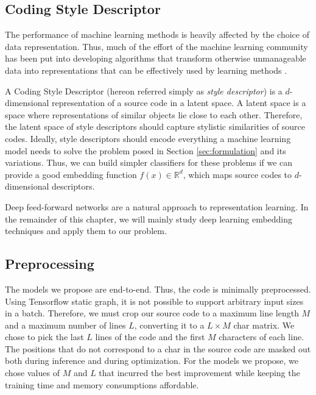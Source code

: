 \subsection{Coding Style Descriptor}\label{sec:descriptor}

The performance of machine learning methods is heavily affected by the choice of data representation. Thus, much of the effort of the machine learning community has been put into developing algorithms that transform otherwise unmanageable data into representations that can be effectively used by learning methods \cite{representation_learning}.

A Coding Style Descriptor (hereon referred simply as \textit{style descriptor}) is a $d$-dimensional representation of a source code in a latent space. A latent space is a space where representations of similar objects lie close to each other. Therefore, the latent space of style descriptors should capture stylistic similarities of source codes. Ideally, style descriptors should encode everything a machine learning model needs to solve the problem posed in Section \ref{sec:formulation} and its variations. Thus, we can build simpler classifiers for these problems if we can provide a good embedding function $f(x) \in \mathbb{R}^d$, which maps source codes to $d$-dimensional descriptors.


Deep feed-forward networks are a natural approach to representation learning. In the remainder of this chapter, we will mainly study deep learning embedding techniques and apply them to our problem.

\subsection{Preprocessing}\label{sec:preprocessing}

The models we propose are end-to-end. Thus, the code is minimally preprocessed. Using Tensorflow static graph, it is not possible to support arbitrary input sizes in a batch. Therefore, we must crop our source code to a maximum line length $M$ and a maximum number of lines $L$, converting it to a $L \times M$ char matrix. We chose to pick the last $L$ lines of the code and the first $M$ characters of each line. The positions that do not correspond to a char in the source code are masked out both during inference and during optimization. For the models we propose, we chose values of $M$ and $L$ that incurred the best improvement while keeping the training time and memory consumptions affordable.

